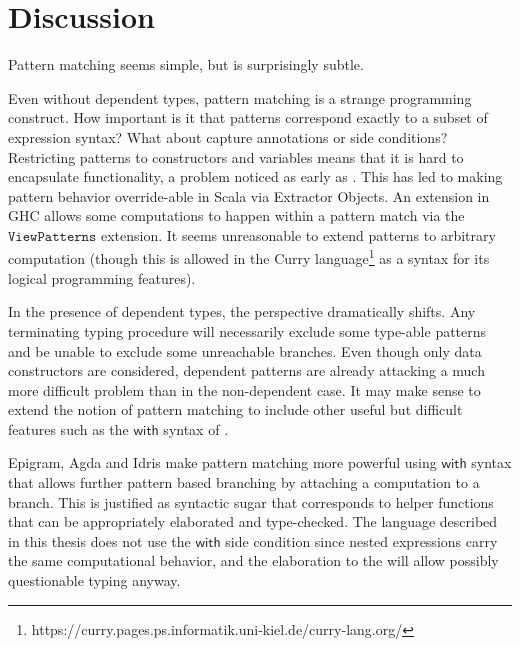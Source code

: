 \section{Discussion}



Pattern matching seems simple, but is surprisingly subtle.

Even without dependent types, pattern matching is a strange programming construct. 
How important is it that patterns correspond exactly to a subset of expression syntax?
What about capture annotations or side conditions?
Restricting patterns to constructors and variables means that it is hard to encapsulate functionality, a problem noticed as early as \cite{10.1145/41625.41653}. 
This has led to making pattern behavior override-able in Scala via Extractor Objects.
An extension in GHC allows some computations to happen within a pattern match via the $\mathtt{ViewPatterns}$ extension.
It seems unreasonable to extend patterns to arbitrary computation (though this is allowed in the Curry language\footnote{https://curry.pages.ps.informatik.uni-kiel.de/curry-lang.org/} as a syntax for its logical programming features). 

In the presence of \fullSp{} dependent types, the perspective dramatically shifts.
Any terminating typing procedure will necessarily exclude some type-able patterns and be unable to exclude some unreachable branches.
Even though only data constructors are considered, dependent patterns are already attacking a much more difficult problem than in the non-dependent case.
It may make sense to extend the notion of pattern matching to include other useful but difficult features such as the $\mathsf{with}$ syntax of \cite{mcbride_mckinna_2004}.


Epigram, Agda and Idris make pattern matching more powerful using $\mathsf{with}$ syntax that allows further pattern based branching by attaching a computation to a branch.
This is justified as syntactic sugar that corresponds to helper functions that can be appropriately elaborated and type-checked.
The language described in this thesis does not use the $\mathsf{with}$ side condition since nested \case{} expressions carry the same computational behavior, and the elaboration to the \clang{} will allow possibly questionable typing anyway.

